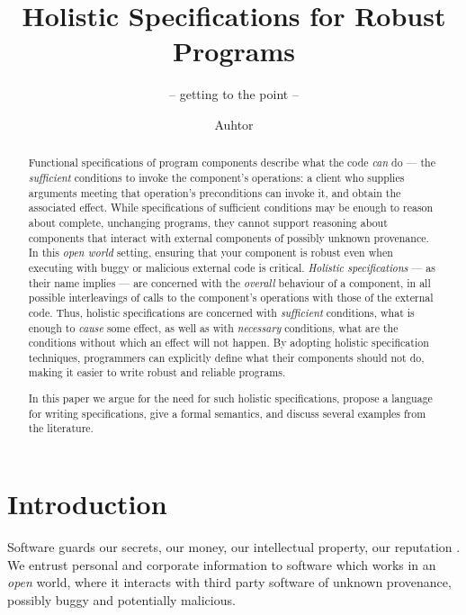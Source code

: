 \documentclass[acmsmall,screen]{acmart}
\newcommand{\sd}[1]{#1} %
\newcommand{\ponders}[3]{\marginpar{\tiny\itshape\raggedright\textcolor{#2}{\textbf{#1:} #3}}\ignorespaces}
\newcommand{\sophia}[1]{} %
\begin{document}
\author{Auhtor}

%
%


\title{Holistic Specifications for Robust Programs}
\subtitle{-- getting to the point --}


\begin{abstract}
Functional specifications of program components describe what
the code \emph{can} do --- the \emph{sufficient} conditions to
invoke the component's operations: 
 a client who supplies arguments
meeting that operation's preconditions can invoke it, %
  and obtain the associated effect.
While specifications of sufficient conditions may be enough to reason about %
complete, unchanging  programs, they cannot support reasoning about
 components that interact with external components of possibly unknown provenance. 
In this  \emph{open world} setting, ensuring that your component is robust even when executing 
with buggy or malicious external code is critical.
 \emph{Holistic specifications}
--- as their name implies --- 
are concerned  with the \emph{overall} behaviour of a component,  in all possible 
interleavings of calls to the component's operations with those of the external code.
Thus, holistic specifications are concerned with \emph{sufficient} conditions, \ie
what is enough to \emph{cause} some effect, as well as with \emph{necessary} conditions, \ie
what are the conditions without which an effect will not happen. 
By adopting holistic specification techniques,
programmers can explicitly define what their components should not do,
making it easier to write
robust and reliable programs.

In this paper we argue for the need for such holistic specifications,
 propose a %
 language \Chainmail for writing specifications, give a formal semantics, and discuss several
examples from the literature.
\end{abstract}


\maketitle

\section{Introduction}
 Software guards our secrets, our money, our intellectual property,
our reputation \cite{covern}.  We entrust personal and
corporate information to software which works in an \emph{open} world, 
where  it interacts with 
third party software of unknown provenance, possibly buggy and potentially malicious.
\end{document}
